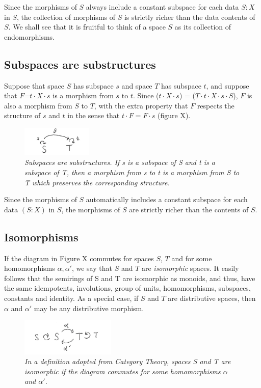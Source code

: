 \documentclass[11pt]{article}
\begin{document}
Since the morphisms of $S$ always include a constant subspace for each data $S:X$ in $S$, the collection of morphisms of $S$ is strictly richer 
than the data contents of $S$.  We shall see that it is fruitful to think of a space $S$ as its collection of endomorphisms. 

\subsection{Subspaces are substructures} 

Suppose that space $S$ has subspace $s$ and space $T$ has subspace $t$, and suppose that $F$=$t\cdot X\cdot s$ is a morphism from $s$ to $t$.   
Since ($t\cdot X\cdot s$) = ($T\cdot t \cdot X\cdot s\cdot S$), 
$F$ is also a morphism from $S$ to $T$, with the extra property that $F$ respects the structure of $s$ and $t$ in the sense that $t\cdot F=F\cdot s$ (figure X).
\begin{figure}[h]
\centering
\includegraphics[width=0.3\textwidth]{subspace.png}
\caption{{\it Subspaces are substructures.  If s is a subspace of S and t is a subspace of T, then a morphism from s to t is
a morphism from S to T which preserves the corresponding structure.}}
\end{figure}
Since the morphisms of $S$ automatically includes a constant subspace for each data $(S:X)$ in $S$, the morphisms of $S$ are strictly richer than the contents of $S$.  

\subsection{Isomorphisms} 

     If the diagram in Figure X commutes for spaces $S$, $T$ and for some homomorphisms $\alpha,\alpha'$, we say that $S$ and $T$ are {\it isomorphic} spaces.  
It easily follows that the semirings of S and T are isomorphic as monoids, and thus, have the same idempotents, involutions, group of units, homomorphisms, subspaces, 
constants and identity.   As a special case, if $S$ and $T$ are distributive spaces, then $\alpha$ and $\alpha'$ may be any distributive morphism.  
\begin{figure}[h]
\centering
\includegraphics[width=0.4\textwidth]{isomorphism.png}
\caption{{\it In a definition adopted from Category Theory, spaces S and T are isomorphic if the diagram commutes for some homomorphisms $\alpha$ and $\alpha'$.}}
\end{figure}
\end{document}
